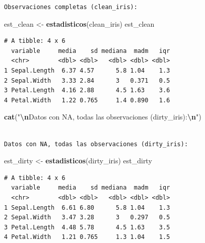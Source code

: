 \documentclass[
]{article}
\newenvironment{Shaded}{\begin{snugshade}}{\end{snugshade}}
\newcommand{\FunctionTok}[1]{\textcolor[rgb]{0.13,0.29,0.53}{\textbf{#1}}}
\newcommand{\NormalTok}[1]{#1}
\newcommand{\OtherTok}[1]{\textcolor[rgb]{0.56,0.35,0.01}{#1}}
\newcommand{\SpecialCharTok}[1]{\textcolor[rgb]{0.81,0.36,0.00}{\textbf{#1}}}
\newcommand{\StringTok}[1]{\textcolor[rgb]{0.31,0.60,0.02}{#1}}
\begin{document}
\begin{verbatim}
Observaciones completas (clean_iris):
\end{verbatim}

\begin{Shaded}
\begin{Highlighting}[]
\NormalTok{est\_clean }\OtherTok{\textless{}{-}} \FunctionTok{estadisticos}\NormalTok{(clean\_iris)}
\NormalTok{est\_clean}
\end{Highlighting}
\end{Shaded}

\begin{verbatim}
# A tibble: 4 x 6
  variable     media    sd mediana  madm   iqr
  <chr>        <dbl> <dbl>   <dbl> <dbl> <dbl>
1 Sepal.Length  6.37 4.57      5.8 1.04    1.3
2 Sepal.Width   3.33 2.84      3   0.371   0.5
3 Petal.Length  4.16 2.88      4.5 1.63    3.6
4 Petal.Width   1.22 0.765     1.4 0.890   1.6
\end{verbatim}

\begin{Shaded}
\begin{Highlighting}[]
\FunctionTok{cat}\NormalTok{(}\StringTok{"}\SpecialCharTok{\textbackslash{}n}\StringTok{Datos con NA, todas las observaciones (dirty\_iris):}\SpecialCharTok{\textbackslash{}n}\StringTok{"}\NormalTok{)}
\end{Highlighting}
\end{Shaded}

\begin{verbatim}

Datos con NA, todas las observaciones (dirty_iris):
\end{verbatim}

\begin{Shaded}
\begin{Highlighting}[]
\NormalTok{est\_dirty }\OtherTok{\textless{}{-}} \FunctionTok{estadisticos}\NormalTok{(dirty\_iris)}
\NormalTok{est\_dirty}
\end{Highlighting}
\end{Shaded}

\begin{verbatim}
# A tibble: 4 x 6
  variable     media    sd mediana  madm   iqr
  <chr>        <dbl> <dbl>   <dbl> <dbl> <dbl>
1 Sepal.Length  6.61 6.80      5.8 1.04    1.3
2 Sepal.Width   3.47 3.28      3   0.297   0.5
3 Petal.Length  4.48 5.78      4.5 1.63    3.5
4 Petal.Width   1.21 0.765     1.3 1.04    1.5
\end{verbatim}
\end{document}
